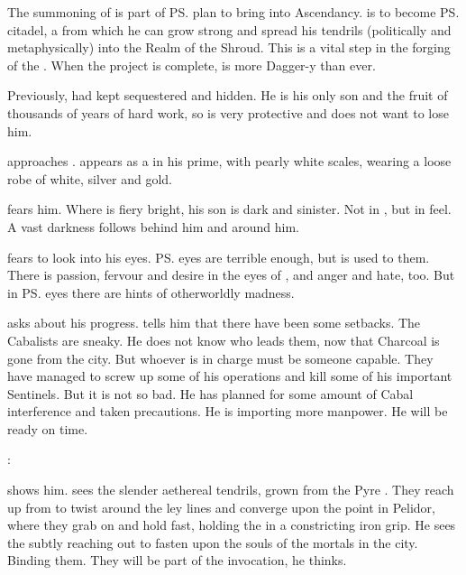 
The summoning of \Nithdornazsh{} is part of \ps{\Secherdamon} plan to bring  into Ascendancy. 
\Nithdornazsh{} is to become \ps{\Vizsherioch} citadel, a \nexus{} from which he can grow strong and spread his tendrils (politically and metaphysically) into the Realm of the Shroud. 
This is a vital step in the forging of the . 
When the \Nithdornazsh{} project is complete, \Vizsherioch{} is more Dagger-y than ever. 

Previously, \Secherdamon{} had kept \Vizsherioch{} sequestered and hidden. 
He is his only son and the fruit of thousands of years of hard work, so \Secherdamon{} is very protective and does not want to lose him. 

\Vizsherioch approaches \LocarPsyrex.
\Vizsherioch appears as a \dax in his prime, with pearly white scales, wearing a loose robe of white, silver and gold. 

\Psyrex fears him. 
Where \Secherdamon is fiery bright, his son \Vizsherioch is dark and sinister. 
Not in \colour, but in feel. 
A vast darkness follows behind him and around him. 

\Psyrex fears to look into his eyes. 
\ps{\Secherdamon} eyes are terrible enough, but \Psyrex is used to them. 
There is passion, fervour and desire in the eyes of \Secherdamon, and anger and hate, too. 
But in \ps{\Vizsherioch} eyes there are hints of otherworldly madness. 

\Vizsherioch asks \Psyrex about his progress. 
\Psyrex tells him that there have been some setbacks. 
The Cabalists are sneaky.
He does not know who leads them, now that Charcoal is gone from the city. 
But whoever is in charge must be someone capable. 
They have managed to screw up some of his operations and kill some of his important Sentinels. 
But it is not so bad. 
He has planned for some amount of Cabal interference and taken precautions. 
He is importing more manpower. 
He will be ready on time. 

\Vizsherioch: 

\Psyrex shows him. 
\Vizsherioch sees the slender aethereal tendrils, grown from the Pyre \matrix.
They reach up from \Nithdornazsh to twist around the ley lines and converge upon the \nexus point in Pelidor, where they grab on and hold fast, holding the \nexus in a constricting iron grip. 
He sees the \matrix subtly reaching out to fasten upon the souls of the mortals in the city. 
Binding them.
They will be part of the invocation, he thinks. 

